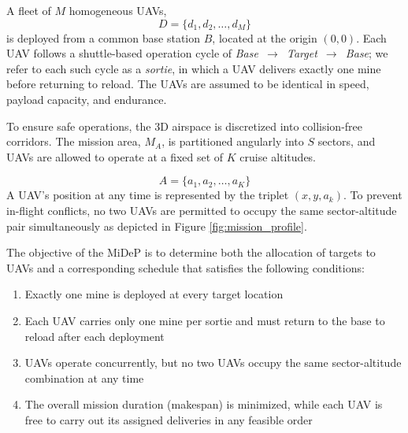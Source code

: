 \documentclass[subscriptcorrection,upint,nolists, varvw,barcolor=Goldenrod3,mathalfa=cal=euler,balance,hyphenate,french]{asmejour} %
\newtheorem{theorem}{Theorem}
\begin{document}
A fleet of \(M\) homogeneous UAVs, 
\[
D=\{d_1, d_2, \dots, d_M\} 
\]
is deployed from a common base station $B$, located at the origin \((0,0)\). Each UAV follows a shuttle-based operation cycle of \emph{Base~\(\rightarrow\)~Target~\(\rightarrow\)~Base}; we refer to each such cycle as a \emph{sortie}, in which a UAV delivers exactly one mine before returning to reload.
The UAVs are assumed to be identical in speed, payload capacity, and endurance. 

To ensure safe operations, the 3D airspace is discretized into collision-free corridors. The mission area, $M_A$, is partitioned angularly into $S$ sectors, and UAVs are allowed to operate at a fixed set of $K$  cruise altitudes. 

\[
A=\{a_1, a_2, \dots, a_K\}
\]
A UAV's position at any time is represented by the triplet \((x, y, a_k)\). 
To prevent in-flight conflicts, no two UAVs are permitted to occupy the same sector-altitude pair simultaneously as depicted in Figure \ref{fig:mission_profile}. 

The objective of the MiDeP is to determine both the allocation of targets to UAVs and a corresponding schedule that satisfies the following conditions:
\begin{enumerate}

    \item Exactly one mine is deployed at every target location
    \item Each UAV carries only one mine per sortie and must return to the base to reload after each deployment
    \item UAVs operate concurrently, but no two UAVs occupy the same sector-altitude combination at any time
    \item The overall mission duration (makespan) is minimized, while each UAV is free to carry out its assigned deliveries in any feasible order
\end{enumerate}


\end{document}
